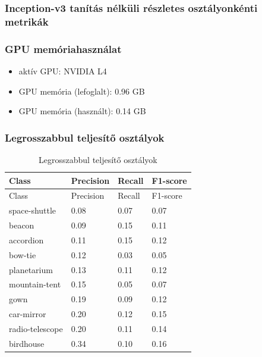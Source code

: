 \subsubsection{Inception-v3 tanítás nélküli részletes osztályonkénti metrikák}
  

\subsubsection{GPU memóriahasználat}
\begin{itemize}
  \item aktív GPU: NVIDIA L4
  \item GPU memória (lefoglalt): 0.96 GB
  \item GPU memória (használt):  0.14 GB
\end{itemize}

\subsubsection{Legrosszabbul teljesítő osztályok}
\begin{center}
  \begin{longtable}{llll}
  \caption{Legrosszabbul teljesítő osztályok}\label{tab:phase01_Inception-v3_legrosszabb_osztlyok}\\
  \toprule
  Class & Precision & Recall & F1-score \\
  \midrule
  \endfirsthead
  \toprule
  Class & Precision & Recall & F1-score \\
  \midrule
  \endhead
  space-shuttle & 0.08 & 0.07 & 0.07 \\
  beacon & 0.09 & 0.15 & 0.11 \\
  accordion & 0.11 & 0.15 & 0.12 \\
  bow-tie & 0.12 & 0.03 & 0.05 \\
  planetarium & 0.13 & 0.11 & 0.12 \\
  mountain-tent & 0.15 & 0.05 & 0.07 \\
  gown & 0.19 & 0.09 & 0.12 \\
  car-mirror & 0.20 & 0.12 & 0.15 \\
  radio-telescope & 0.20 & 0.11 & 0.14 \\
  birdhouse & 0.34 & 0.10 & 0.16 \\
  \bottomrule
  \end{longtable}
  \end{center}
  